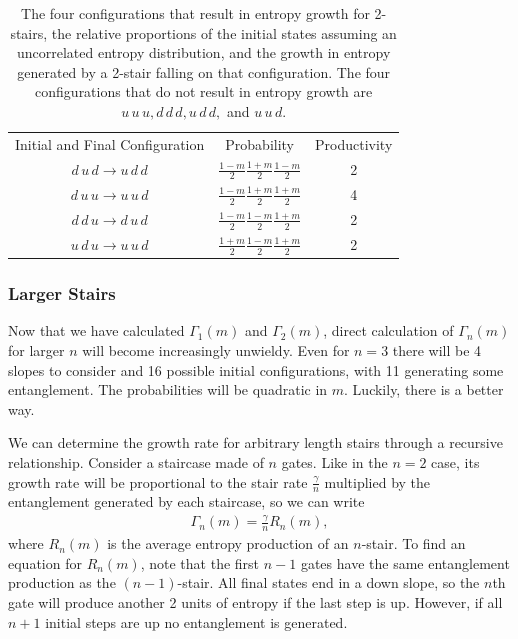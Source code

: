 \begin{table}
	\centering
	\begin{tabular}{ccc}
		Initial and Final 
		Configuration        & Probability         & Productivity\\
		$d\,u\,d\to u\,d\,d$ & $\frac{1-m}{2}\frac{1+m}{2}\frac{1-m}{2}$ & 2\\
		$d\,u\,u\to u\,u\,d$ & $\frac{1-m}{2}\frac{1+m}{2}\frac{1+m}{2}$ & 4\\
		$d\,d\,u\to d\,u\,d$ & $\frac{1-m}{2}\frac{1-m}{2}\frac{1+m}{2}$ & 2\\
		$u\,d\,u\to u\,u\,d$ & $\frac{1+m}{2}\frac{1-m}{2}\frac{1+m}{2}$ & 2
	\end{tabular}
	\caption{The four configurations that result in entropy growth for 2-stairs, the relative proportions of the initial states assuming an uncorrelated entropy distribution, and the growth in entropy generated by a 2-stair falling on that configuration. The four configurations that do not result in entropy growth are $u\,u\,u, d\,d\,d, u\,d\,d,$ and $u\,u\,d$.}
	\label{tab:2stair}
\end{table}

\subsubsection{Larger Stairs}  \label{subsub:largestairs}

Now that we have calculated $\Gamma_1(m)$ and $\Gamma_2(m)$, direct calculation of $\Gamma_n(m)$ for larger $n$ will become increasingly unwieldy. Even for $n=3$ there will be 4 slopes to consider and 16 possible initial configurations, with 11 generating some entanglement. The probabilities will be quadratic in $m$. Luckily, there is a better way.

We can determine the growth rate for arbitrary length stairs through a recursive relationship. Consider a staircase made of $n$ gates. Like in the $n=2$ case, its growth rate will be proportional to the stair rate $\frac{\gamma}{n}$ multiplied by the entanglement generated by each staircase, so we can write
\begin{align}
\Gamma_n(m) = \frac{\gamma}{n}R_n(m), \label{eqn:growthrate}
\end{align}
where $R_n(m)$ is the average entropy production of an $n$-stair. To find an equation for $R_n(m)$, note that the first $n-1$ gates have the same entanglement production as the $(n-1)$-stair. All final states end in a down slope, so the $n$th gate will produce another 2 units of entropy if the last step is up. However, if all $n+1$ initial steps are up no entanglement is generated. 

